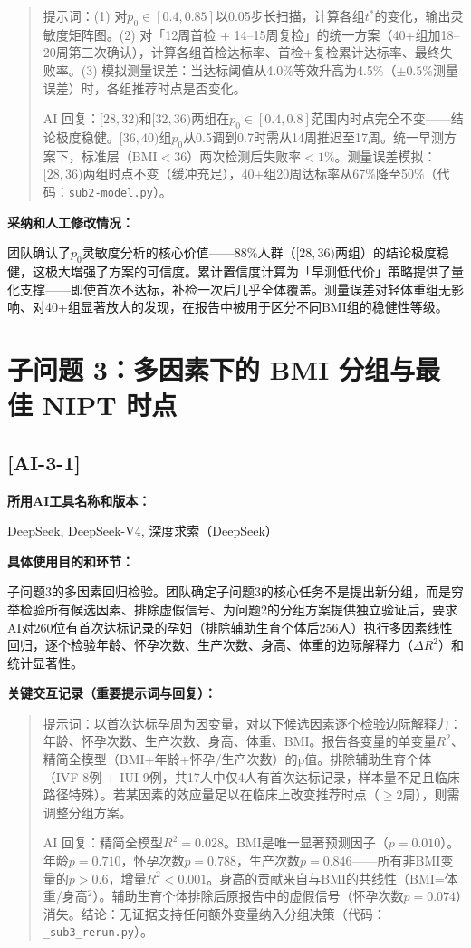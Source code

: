 \documentclass[12pt,a4paper]{ctexart}
\begin{document}
\begin{quote}
提示词：(1) 对$p_0\in[0.4,0.85]$以0.05步长扫描，计算各组$t^*$的变化，输出灵敏度矩阵图。(2) 对「12周首检 + 14--15周复检」的统一方案（40+组加18--20周第三次确认），计算各组首检达标率、首检+复检累计达标率、最终失败率。(3) 模拟测量误差：当达标阈值从4.0\%等效升高为4.5\%（$\pm0.5\%$测量误差）时，各组推荐时点是否变化。

AI 回复：$[28,32)$和$[32,36)$两组在$p_0\in[0.4,0.8]$范围内时点完全不变——结论极度稳健。$[36,40)$组$p_0$从0.5调到0.7时需从14周推迟至17周。统一早测方案下，标准层（BMI$<36$）两次检测后失败率$<1\%$。测量误差模拟：$[28,36)$两组时点不变（缓冲充足），40+组20周达标率从67\%降至50\%（代码：\texttt{sub2-model.py}）。
\end{quote}

\textbf{采纳和人工修改情况：}

团队确认了$p_0$灵敏度分析的核心价值——88\%人群（$[28,36)$两组）的结论极度稳健，这极大增强了方案的可信度。累计置信度计算为「早测低代价」策略提供了量化支撑——即使首次不达标，补检一次后几乎全体覆盖。测量误差对轻体重组无影响、对40+组显著放大的发现，在报告中被用于区分不同BMI组的稳健性等级。

\section*{子问题 3：多因素下的 BMI 分组与最佳 NIPT 时点}

\subsection*{[AI-3-1]}

\textbf{所用AI工具名称和版本：}

DeepSeek, DeepSeek-V4, 深度求索（DeepSeek）

\textbf{具体使用目的和环节：}

子问题3的多因素回归检验。团队确定子问题3的核心任务不是提出新分组，而是穷举检验所有候选因素、排除虚假信号、为问题2的分组方案提供独立验证后，要求AI对260位有首次达标记录的孕妇（排除辅助生育个体后256人）执行多因素线性回归，逐个检验年龄、怀孕次数、生产次数、身高、体重的边际解释力（$\Delta R^2$）和统计显著性。

\textbf{关键交互记录（重要提示词与回复）：}

\begin{quote}
提示词：以首次达标孕周为因变量，对以下候选因素逐个检验边际解释力：年龄、怀孕次数、生产次数、身高、体重、BMI。报告各变量的单变量$R^2$、精简全模型（BMI+年龄+怀孕/生产次数）的p值。排除辅助生育个体（IVF 8例 + IUI 9例，共17人中仅4人有首次达标记录，样本量不足且临床路径特殊）。若某因素的效应量足以在临床上改变推荐时点（$\geq2$周），则需调整分组方案。

AI 回复：精简全模型$R^2=0.028$。BMI是唯一显著预测因子（$p=0.010$）。年龄$p=0.710$，怀孕次数$p=0.788$，生产次数$p=0.846$——所有非BMI变量的$p>0.6$，增量$R^2<0.001$。身高的贡献来自与BMI的共线性（BMI=体重/身高$^2$）。辅助生育个体排除后原报告中的虚假信号（怀孕次数$p=0.074$）消失。结论：无证据支持任何额外变量纳入分组决策（代码：\texttt{\_sub3\_rerun.py}）。
\end{quote}
\end{document}
